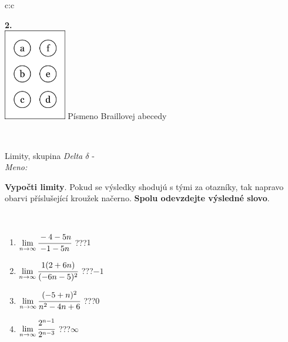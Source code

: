 \documentclass[10pt]{report}
\begin{document}
\begin{tabular}{c:c}
\begin{minipage}[c][104.5mm][t]{0.5\linewidth}
\begin{center}
\begin{minipage}{0.20\linewidth}
\begin{center}
{\Huge\bfseries 2.} \\[2mm]
\includegraphics[height=40mm]{../images/braille.png}
{\small Písmeno Braillovej abecedy}
\end{center}
\end{minipage}
\end{center}
\end{minipage}
\\ \hdashline
\begin{minipage}[c][104.5mm][t]{0.5\linewidth}
\begin{center}
\vspace{7mm}
{\huge Limity, skupina \textit{Delta $\delta$} -}\\[5mm]
\textit{Meno:}\phantom{xxxxxxxxxxxxxxxxxxxxxxxxxxxxxxxxxxxxxxxxxxxxxxxxxxxxxxxxxxxxxxxxx}\\[5mm]
\begin{minipage}{0.95\linewidth}
\begin{center}
\textbf{Vypočti limity}. Pokud se výsledky shodujú s tými za otazníky, tak napravo\\obarvi příslušející kroužek načerno. \textbf{Spolu odevzdejte výsledné slovo}.
\end{center}
\end{minipage}
\\[1mm]
\begin{minipage}{0.79\linewidth}
\begin{center}
\begin{varwidth}{\linewidth}
\begin{enumerate}
\normalsize
\item $\lim\limits_{n\to\infty}\cfrac{-4-5n}{-1-5n}$\quad \dotfill\; ???\;\dotfill \quad $1$
\item $\lim\limits_{n\to\infty}\cfrac{1(2+6n)}{(-6n-5)^2}$\quad \dotfill\; ???\;\dotfill \quad $-1$
\item $\lim\limits_{n\to\infty}\cfrac{(-5+n)^2}{n^2-4n+6}$\quad \dotfill\; ???\;\dotfill \quad $0$
\item $\lim\limits_{n\to\infty}\cfrac{2^{n-1}}{2^{n-3}}$\quad \dotfill\; ???\;\dotfill \quad $\infty$

\end{enumerate}
\end{varwidth}
\end{center}
\end{minipage}
\end{center}
\end{minipage}
\end{tabular}
\end{document}
